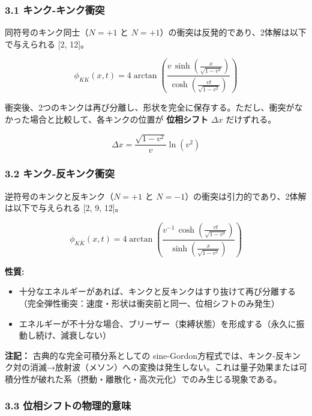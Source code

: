 \documentclass[a4paper,11pt]{ltjsarticle}
\providecommand{\tightlist}{\setlength{\itemsep}{0pt}\setlength{\parskip}{0pt}}
\begin{document}
\subsubsection{3.1
キンク-キンク衝突}\label{ux30adux30f3ux30af-ux30adux30f3ux30afux885dux7a81}

同符号のキンク同士（\(N = +1\) と
\(N = +1\)）の衝突は反発的であり、2体解は以下で与えられる {[}2, 12{]}。

\[\phi_{KK}(x, t) = 4\arctan\left(\frac{v\,\sinh\left(\frac{x}{\sqrt{1-v^2}}\right)}{\cosh\left(\frac{vt}{\sqrt{1-v^2}}\right)}\right)\]

衝突後、2つのキンクは再び分離し、形状を完全に保存する。ただし、衝突がなかった場合と比較して、各キンクの位置が
\textbf{位相シフト} \(\Delta x\) だけずれる。

\[\Delta x = \frac{\sqrt{1 - v^2}}{v}\ln(v^2)\]

\subsubsection{3.2
キンク-反キンク衝突}\label{ux30adux30f3ux30af-ux53cdux30adux30f3ux30afux885dux7a81}

逆符号のキンクと反キンク（\(N = +1\) と
\(N = -1\)）の衝突は引力的であり、2体解は以下で与えられる {[}2, 9,
12{]}。

\[\phi_{K\bar{K}}(x, t) = 4\arctan\left(\frac{v^{-1}\,\cosh\left(\frac{vt}{\sqrt{1-v^2}}\right)}{\sinh\left(\frac{x}{\sqrt{1-v^2}}\right)}\right)\]

\textbf{性質:}

\begin{itemize}
\tightlist
\item
  十分なエネルギーがあれば、キンクと反キンクはすり抜けて再び分離する（完全弾性衝突：速度・形状は衝突前と同一、位相シフトのみ発生）
\item
  エネルギーが不十分な場合、ブリーザー（束縛状態）を形成する（永久に振動し続け、減衰しない）
\end{itemize}

\textbf{注記：} 古典的な完全可積分系としての
sine-Gordon方程式では、キンク-反キンク対の消滅→放射波（メソン）への変換は発生しない。これは量子効果または可積分性が破れた系（摂動・離散化・高次元化）でのみ生じる現象である。

\subsubsection{3.3
位相シフトの物理的意味}\label{ux4f4dux76f8ux30b7ux30d5ux30c8ux306eux7269ux7406ux7684ux610fux5473}
\end{document}
